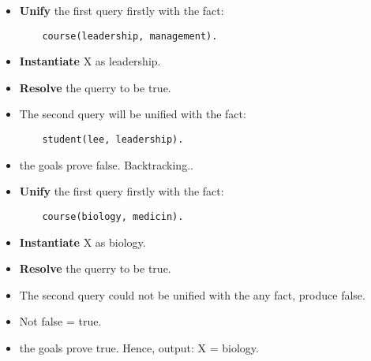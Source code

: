 \begin{itemize}
    \item \textbf{Unify} the first query firstly with the fact:
    \begin{lstlisting}
    course(leadership, management).
    \end{lstlisting}
    \item \textbf{Instantiate} X as leadership.
    \item \textbf{Resolve} the querry to be true.
    \item The second query will be unified with the fact:
    \begin{lstlisting}
    student(lee, leadership).
    \end{lstlisting}
    \item the goals prove false. Backtracking..
\end{itemize}

\begin{itemize}
    \item \textbf{Unify} the first query firstly with the fact:
    \begin{lstlisting}
    course(biology, medicin).
    \end{lstlisting}
    \item \textbf{Instantiate} X as biology.
    \item \textbf{Resolve} the querry to be true.
    \item The second query could not be unified with the any fact, produce false. 
    \item Not false  = true.
    \item the goals prove true. Hence, output: X = biology.
\end{itemize}
\newpage

